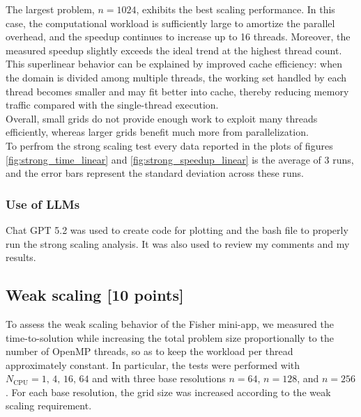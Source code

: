 \documentclass[unicode,10pt,a4paper,oneside,numbers=endperiod,openany]{scrartcl}
\begin{document}
The largest problem, \(n=1024\), exhibits the best scaling performance. In this case, the computational workload is sufficiently large to amortize the parallel overhead, and the speedup continues to increase up to 16 threads. Moreover, the measured speedup slightly exceeds the ideal trend at the highest thread count. This superlinear behavior can be explained by improved cache efficiency: when the domain is divided among multiple threads, the working set handled by each thread becomes smaller and may fit better into cache, thereby reducing memory traffic compared with the single-thread execution.\\

Overall, small grids do not provide enough work to exploit many threads efficiently, whereas larger grids benefit much more from parallelization.\\

To perfrom the strong scaling test every data reported in the plots of figures \ref{fig:strong_time_linear} and \ref{fig:strong_speedup_linear} is the average of 3 runs, and the error bars represent the standard deviation across these runs.\\

\subsubsection{Use of LLMs}
Chat GPT 5.2 was used to create code for plotting and the bash file to properly run the strong scaling analysis. It was also used to review my comments and my results.

\subsection{Weak scaling [10 points]}
To assess the weak scaling behavior of the Fisher mini-app, we measured the time-to-solution while increasing the total problem size proportionally to the number of OpenMP threads, so as to keep the workload per thread approximately constant. In particular, the tests were performed with $N_{\mathrm{CPU}} = 1,\,4,\,16,\,64 $ and with three base resolutions \(n=64\), \(n=128\), and \(n=256\). For each base resolution, the grid size was increased according to the weak scaling requirement.\\
\end{document}
